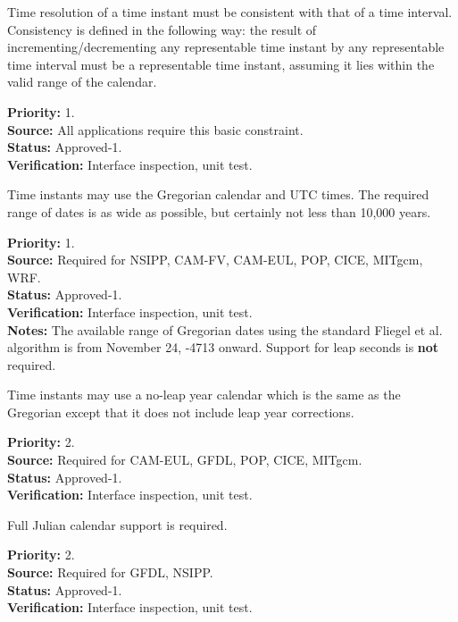 Time resolution of a time instant must be consistent with that of a time interval.
Consistency is defined in the following way:  the result of incrementing/decrementing 
any representable time instant by any representable time interval must be a representable 
time instant, assuming it lies within the valid range of the calendar.
\begin{reqlist}
{\bf Priority:} 1. \\
{\bf Source:} All applications require this basic constraint.\\
{\bf Status:} Approved-1. \\
{\bf Verification:} Interface inspection, unit test. 
\end{reqlist}

\label{req:calendar}

Time instants may use the Gregorian calendar and UTC times.  The required 
range of dates is as wide as possible, but certainly not less than 10,000 years.
\begin{reqlist}
{\bf Priority:} 1.\\
{\bf Source:} Required for NSIPP, CAM-FV, CAM-EUL, POP, CICE, MITgcm, WRF. \\
{\bf Status:} Approved-1. \\
{\bf Verification:} Interface inspection, unit test. \\
{\bf Notes:} The available range of Gregorian dates using the standard 
Fliegel et al.\cite{Fli68} algorithm is from November 24, -4713 onward.
Support for leap seconds is {\bf not} required.
\end{reqlist}

Time instants may use a no-leap year calendar which is the same as the Gregorian
except that it does not include leap year corrections.  
\begin{reqlist}
{\bf Priority:} 2. \\
{\bf Source:} Required for CAM-EUL, GFDL, POP, CICE, MITgcm. \\
{\bf Status:} Approved-1. \\
{\bf Verification:} Interface inspection, unit test. 
\end{reqlist}

Full Julian calendar support is required.
\begin{reqlist}
{\bf Priority:} 2. \\
{\bf Source:} Required for GFDL, NSIPP. \\
{\bf Status:} Approved-1. \\
{\bf Verification:} Interface inspection, unit test. 
\end{reqlist}

